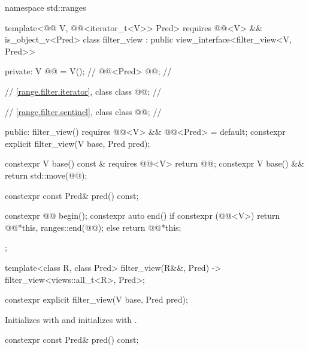 %
%
%
\begin{codeblock}
namespace std::ranges {
  template<@@ V, @@<iterator_t<V>> Pred>
    requires @@<V> && is_object_v<Pred>
  class filter_view : public view_interface<filter_view<V, Pred>> {
  private:
    V @@ = V();                              // \expos
    @@<Pred> @@;                    // \expos

    // \ref{range.filter.iterator}, class 
    class @@;                             // \expos

    // \ref{range.filter.sentinel}, class 
    class @@;                             // \expos

  public:
    filter_view() requires @@<V> && @@<Pred> = default;
    constexpr explicit filter_view(V base, Pred pred);

    constexpr V base() const & requires @@<V> { return @@; }
    constexpr V base() && { return std::move(@@); }

    constexpr const Pred& pred() const;

    constexpr @@ begin();
    constexpr auto end() {
      if constexpr (@@<V>)
        return @@{*this, ranges::end(@@)};
      else
        return @@{*this};
    }
  };

  template<class R, class Pred>
    filter_view(R&&, Pred) -> filter_view<views::all_t<R>, Pred>;
}
\end{codeblock}

%
\begin{itemdecl}
constexpr explicit filter_view(V base, Pred pred);
\end{itemdecl}

\begin{itemdescr}
\pnum
\effects
Initializes  with  and initializes
 with .
\end{itemdescr}

%
\begin{itemdecl}
constexpr const Pred& pred() const;
\end{itemdecl}

